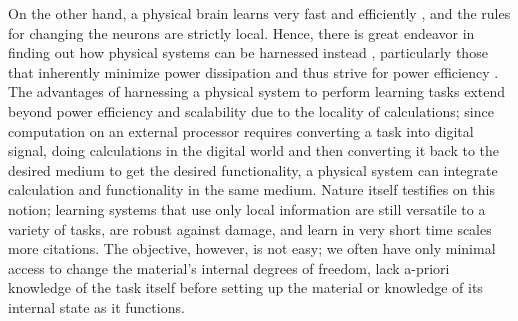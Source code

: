 \documentclass[%
 reprint,
 amsmath,amssymb,
 aps,
]{revtex4-2}
\begin{document}
    On the other hand, a physical brain learns very fast and efficiently \cite{sengupta2014power}, and the rules for changing the neurons are strictly local.
    Hence, there is great endeavor in finding out how physical systems can be harnessed instead \cite{stern2023learning, lopez2023self, martinez2024fluidic}, particularly those that inherently minimize power dissipation and thus strive for power efficiency \cite{vadlamani2020physics}.
    The advantages of harnessing a physical system to perform learning tasks extend beyond power efficiency and scalability due to the locality of calculations; since computation on an external processor requires converting a task into digital signal, doing calculations in the digital world and then converting it back to the desired medium to get the desired functionality, a physical system can integrate calculation and functionality in the same medium. 
    Nature itself testifies on this notion; learning systems that use only local information are still versatile to a variety of tasks, are robust against damage, and learn in very short time scales \textcolor{roie}{more citations}. The objective, however, is not easy; we often have only minimal access to change the material's internal degrees of freedom, lack a-priori knowledge of the task itself before setting up the material or knowledge of its internal state as it functions.
    
\end{document}
